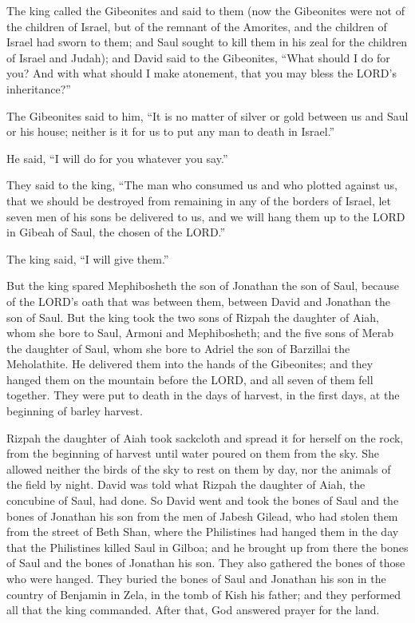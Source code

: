 The king called the Gibeonites and said to them (now the
Gibeonites were not of the children of Israel, but of the remnant of the
Amorites, and the children of Israel had sworn to them; and Saul sought
to kill them in his zeal for the children of Israel and Judah);
 and David said to the Gibeonites, ``What should I do for
you? And with what should I make atonement, that you may bless the
LORD's inheritance?''

 The Gibeonites said to him, ``It is no matter of silver
or gold between us and Saul or his house; neither is it for us to put
any man to death in Israel.''

He said, ``I will do for you whatever you say.''

 They said to the king, ``The man who consumed us and who
plotted against us, that we should be destroyed from remaining in any of
the borders of Israel,  let seven men of his sons be
delivered to us, and we will hang them up to the LORD in Gibeah of Saul,
the chosen of the LORD.''

The king said, ``I will give them.''

 But the king spared Mephibosheth the son of Jonathan the
son of Saul, because of the LORD's oath that was between them, between
David and Jonathan the son of Saul.  But the king took the
two sons of Rizpah the daughter of Aiah, whom she bore to Saul, Armoni
and Mephibosheth; and the five sons of Merab the daughter of Saul, whom
she bore to Adriel the son of Barzillai the Meholathite. 
He delivered them into the hands of the Gibeonites; and they hanged them
on the mountain before the LORD, and all seven of them fell together.
They were put to death in the days of harvest, in the first days, at the
beginning of barley harvest.

 Rizpah the daughter of Aiah took sackcloth and spread it
for herself on the rock, from the beginning of harvest until water
poured on them from the sky. She allowed neither the birds of the sky to
rest on them by day, nor the animals of the field by night.
 David was told what Rizpah the daughter of Aiah, the
concubine of Saul, had done.  So David went and took the
bones of Saul and the bones of Jonathan his son from the men of Jabesh
Gilead, who had stolen them from the street of Beth Shan, where the
Philistines had hanged them in the day that the Philistines killed Saul
in Gilboa;  and he brought up from there the bones of
Saul and the bones of Jonathan his son. They also gathered the bones of
those who were hanged.  They buried the bones of Saul and
Jonathan his son in the country of Benjamin in Zela, in the tomb of Kish
his father; and they performed all that the king commanded. After that,
God answered prayer for the land.

